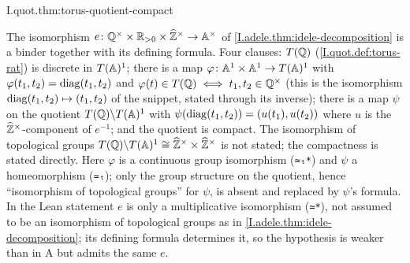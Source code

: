 \begin{tfformal}{I.quot.thm:torus-quotient-compact}
\begin{tffidelity}
The isomorphism $e\colon\mathbb{Q}^\times\times\mathbb{R}_{>0}\times\widehat{\mathbb{Z}}^\times\to\mathbb{A}^\times$ of \cref{I.adele.thm:idele-decomposition} is a binder together with its defining formula. Four clauses: $T(\mathbb{Q})$ (\cref{I.quot.def:torus-rat}) is discrete in $T(\mathbb{A})^1$; there is a map $\varphi\colon\mathbb{A}^1\times\mathbb{A}^1\to T(\mathbb{A})^1$ with $\varphi(t_1,t_2)=\operatorname{diag}(t_1,t_2)$ and $\varphi(t)\in T(\mathbb{Q})\iff t_1,t_2\in\mathbb{Q}^\times$ (this is the isomorphism $\operatorname{diag}(t_1,t_2)\mapsto(t_1,t_2)$ of the snippet, stated through its inverse); there is a map $\psi$ on the quotient $T(\mathbb{Q})\backslash T(\mathbb{A})^1$ with $\psi(\operatorname{diag}(t_1,t_2))=(u(t_1),u(t_2))$ where $u$ is the $\widehat{\mathbb{Z}}^\times$-component of $e^{-1}$; and the quotient is compact. The isomorphism of topological groups $T(\mathbb{Q})\backslash T(\mathbb{A})^1\cong\widehat{\mathbb{Z}}^\times\times\widehat{\mathbb{Z}}^\times$ is not stated; the compactness is stated directly. Here $\varphi$ is a continuous group isomorphism (\texttt{≃ₜ*}) and $\psi$ a homeomorphism (\texttt{≃ₜ}); only the group structure on the quotient, hence ``isomorphism of topological groups'' for $\psi$, is absent and replaced by $\psi$'s formula. In the Lean statement $e$ is only a multiplicative isomorphism (\texttt{≃*}), not assumed to be an isomorphism of topological groups as in \cref{I.adele.thm:idele-decomposition}; its defining formula determines it, so the hypothesis is weaker than in A but admits the same $e$.
\end{tffidelity}
\end{tfformal}

